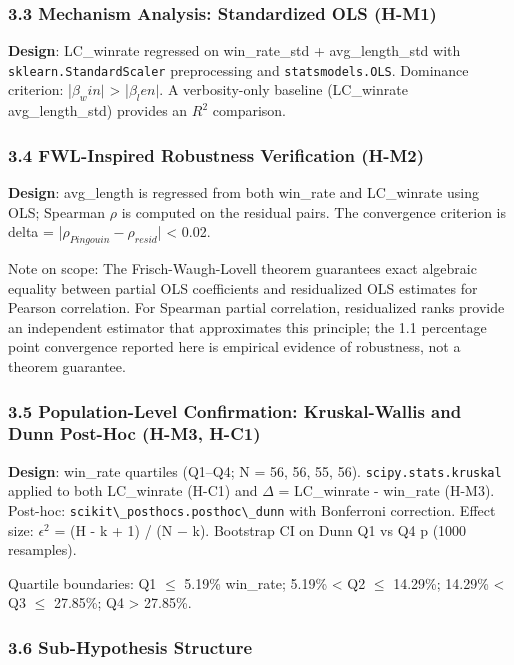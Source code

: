\subsubsection{3.3 Mechanism Analysis: Standardized OLS (H-M1)}

\textbf{Design}: LC\_winrate regressed on win\_rate\_std + avg\_length\_std with \texttt{sklearn.StandardScaler} preprocessing and \texttt{statsmodels.OLS}. Dominance criterion: |$\beta _win|$ > |$\beta _len|$. A verbosity-only baseline (LC\_winrate ~ avg\_length\_std) provides an $R^2$ comparison.

\subsubsection{3.4 FWL-Inspired Robustness Verification (H-M2)}

\textbf{Design}: avg\_length is regressed from both win\_rate and LC\_winrate using OLS; Spearman $\rho$ is computed on the residual pairs. The convergence criterion is delta = |$\rho_{Pingouin} - \rho_{resid}$| < 0.02.

Note on scope: The Frisch-Waugh-Lovell theorem guarantees exact algebraic equality between partial OLS coefficients and residualized OLS estimates for Pearson correlation. For Spearman partial correlation, residualized ranks provide an independent estimator that approximates this principle; the 1.1 percentage point convergence reported here is empirical evidence of robustness, not a theorem guarantee.

\subsubsection{3.5 Population-Level Confirmation: Kruskal-Wallis and Dunn Post-Hoc (H-M3, H-C1)}

\textbf{Design}: win\_rate quartiles (Q1--Q4; N = 56, 56, 55, 56). \texttt{scipy.stats.kruskal} applied to both LC\_winrate (H-C1) and $\Delta$ = LC\_winrate - win\_rate (H-M3). Post-hoc: \texttt{scikit\textbackslash \_posthocs.posthoc\textbackslash \_dunn} with Bonferroni correction. Effect size: $\epsilon ^2$ = (H - k + 1) / (N $-$ k). Bootstrap CI on Dunn Q1 vs Q4 p (1000 resamples).

Quartile boundaries: Q1 $\leq$ 5.19\% win\_rate; 5.19\% < Q2 $\leq$ 14.29\%; 14.29\% < Q3 $\leq$ 27.85\%; Q4 > 27.85\%.

\subsubsection{3.6 Sub-Hypothesis Structure}

